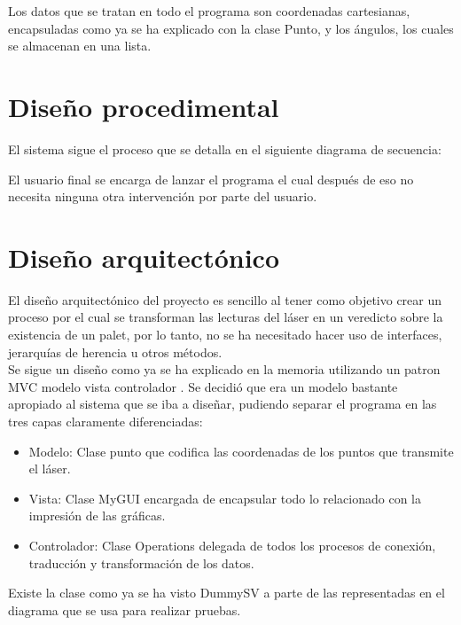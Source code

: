 Los datos que se tratan en todo el programa son coordenadas cartesianas, encapsuladas como ya se ha explicado con la clase Punto, y los ángulos, los cuales se almacenan en una lista.

\section{Diseño procedimental}

El sistema sigue el proceso que se detalla en el siguiente diagrama de secuencia:\\

El usuario final se encarga de lanzar el programa el cual después de eso no necesita ninguna otra intervención por parte del usuario.


\section{Diseño arquitectónico}


El diseño arquitectónico del proyecto es sencillo al tener como objetivo crear un proceso por el cual se transforman las lecturas del láser en un veredicto sobre la existencia de un palet, por lo tanto, no se ha necesitado hacer uso de interfaces, jerarquías de herencia u otros métodos.\\
Se sigue un diseño como ya se ha explicado en la memoria utilizando un patron MVC modelo vista controlador \cite{wiki:mvc}.
Se decidió que era un modelo bastante apropiado al sistema que se iba a diseñar, pudiendo separar el programa en las tres capas claramente diferenciadas:\\
\begin{itemize}
\item Modelo: Clase punto que codifica las coordenadas de los puntos que transmite el láser.
\item Vista: Clase MyGUI encargada de encapsular todo lo relacionado con la impresión de las gráficas.
\item Controlador: Clase Operations delegada de todos los procesos de conexión, traducción y transformación de los datos.
\end{itemize}


Existe la clase como ya se ha visto DummySV a parte de las representadas en el diagrama que se usa para realizar pruebas.
